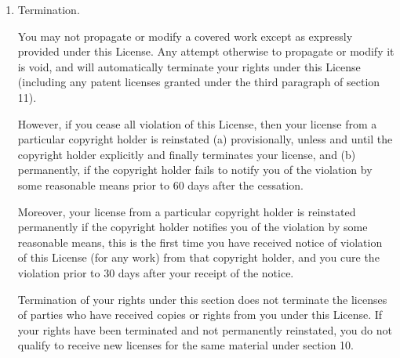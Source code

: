 \begin{enumerate}
All other non-permissive additional terms are considered ``further
restrictions'' within the meaning of section 10.  If the Program as you
received it, or any part of it, contains a notice stating that it is
governed by this License along with a term that is a further
restriction, you may remove that term.  If a license document contains
a further restriction but permits relicensing or conveying under this
License, you may add to a covered work material governed by the terms
of that license document, provided that the further restriction does
not survive such relicensing or conveying.

If you add terms to a covered work in accord with this section, you
must place, in the relevant source files, a statement of the
additional terms that apply to those files, or a notice indicating
where to find the applicable terms.

Additional terms, permissive or non-permissive, may be stated in the
form of a separately written license, or stated as exceptions;
the above requirements apply either way.

\item Termination.

You may not propagate or modify a covered work except as expressly
provided under this License.  Any attempt otherwise to propagate or
modify it is void, and will automatically terminate your rights under
this License (including any patent licenses granted under the third
paragraph of section 11).

However, if you cease all violation of this License, then your
license from a particular copyright holder is reinstated (a)
provisionally, unless and until the copyright holder explicitly and
finally terminates your license, and (b) permanently, if the copyright
holder fails to notify you of the violation by some reasonable means
prior to 60 days after the cessation.

Moreover, your license from a particular copyright holder is
reinstated permanently if the copyright holder notifies you of the
violation by some reasonable means, this is the first time you have
received notice of violation of this License (for any work) from that
copyright holder, and you cure the violation prior to 30 days after
your receipt of the notice.

Termination of your rights under this section does not terminate the
licenses of parties who have received copies or rights from you under
this License.  If your rights have been terminated and not permanently
reinstated, you do not qualify to receive new licenses for the same
material under section 10.


\end{enumerate}
